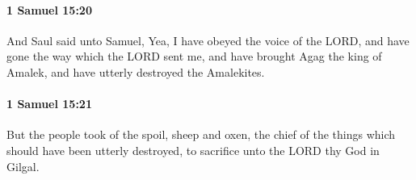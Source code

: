 		\paragraph{1 Samuel 15:20} %
			\label{1SAMUEL-15-20}

			And Saul said unto Samuel, Yea, I have obeyed the voice of the LORD, and have gone the way which the LORD sent me, and have brought Agag the king of Amalek, and have utterly destroyed the Amalekites.


		\paragraph{1 Samuel 15:21} %
			\label{1SAMUEL-15-21}

			But the people took of the spoil, sheep and oxen, the chief of the things which should have been utterly destroyed, to sacrifice unto the LORD thy God in Gilgal.


